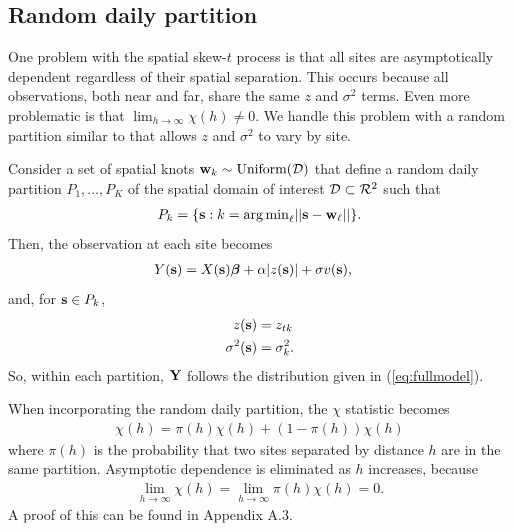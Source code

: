 \documentclass[11pt]{article}
\begin{document}
\subsection{Random daily partition}\label{s:part}
One problem with the spatial skew-$t$ process is that all sites are asymptotically dependent regardless of their spatial separation.
This occurs because all observations, both near and far, share the same $z$ and $\sigma^2$ terms.
Even more problematic is that $\lim_{h \rightarrow \infty} \chi(h) \neq 0$.
We handle this problem with a random partition similar to \citet{Kim2005} that allows $z$ and $\sigma^2$ to vary by site.

Consider a set of spatial knots $\mbox{\bf w}_{k} \sim \text{Uniform}({\cal D})$ that define a random daily partition $P_{1}, \ldots, P_{K}$ of the spatial domain of interest ${\cal D} \subset {\cal R}^2$ such that
\begin{align*}
  P_{k} = \{ \mbox{\bf s} : k = {\mathop{\rm arg\, min}}_\ell || \mbox{\bf s} - \mbox{\bf w}_{\ell} || \}.
\end{align*}
Then, the observation at each site becomes
\begin{align}
  Y(\mbox{\bf s}) &= X(\mbox{\bf s}) \mbox{\boldmath $\beta$} + \alpha |z(\mbox{\bf s})| + \sigma v(\mbox{\bf s}),
\end{align}
and, for $\mbox{\bf s} \in P_{k}$,
\begin{align}
  z(\mbox{\bf s}) &= z_{tk} \label{eq:sitez}\\
  \sigma^2(\mbox{\bf s}) &= \sigma^2_{k} \label{eq:sitesig}.
\end{align}
So, within each partition, $\mbox{\bf Y}$ follows the distribution given in (\ref{eq:fullmodel}).

When incorporating the random daily partition, the $\chi$ statistic becomes
\begin{align}
  \chi(h) = \pi(h) \chi(h) + (1 - \pi(h)) \chi(h)
\end{align}
where $\pi(h)$ is the probability that two sites separated by distance $h$ are in the same partition.
Asymptotic dependence is eliminated as $h$ increases, because
\begin{align}
  \lim_{h \rightarrow \infty} \chi(h) = \lim_{h \rightarrow \infty} \pi(h) \chi(h) = 0.
\end{align}
A proof of this can be found in Appendix A.3.
\end{document}

